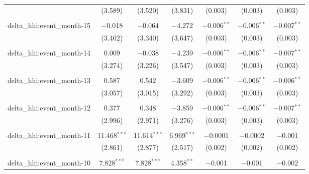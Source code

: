 \begin{table}[H]
{\begin{tabular}{@{\extracolsep{5pt}}lcccccc}
   & (3.589) & (3.520) & (3.831) & (0.003) & (0.003) & (0.003) \\  

   & & & & & & \\  

  delta\_hhi:event\_month-15 & $-$0.018 & $-$0.064 & $-$4.272 & $-$0.006$^{**}$ & $-$0.006$^{**}$ & $-$0.007$^{**}$ \\  

   & (3.402) & (3.340) & (3.647) & (0.003) & (0.003) & (0.003) \\  

   & & & & & & \\  

  delta\_hhi:event\_month-14 & 0.009 & $-$0.038 & $-$4.239 & $-$0.006$^{**}$ & $-$0.006$^{**}$ & $-$0.007$^{**}$ \\  

   & (3.274) & (3.226) & (3.547) & (0.003) & (0.003) & (0.003) \\  

   & & & & & & \\  

  delta\_hhi:event\_month-13 & 0.587 & 0.542 & $-$3.609 & $-$0.006$^{**}$ & $-$0.006$^{**}$ & $-$0.006$^{**}$ \\  

   & (3.057) & (3.015) & (3.292) & (0.003) & (0.003) & (0.003) \\  

   & & & & & & \\  

  delta\_hhi:event\_month-12 & 0.377 & 0.348 & $-$3.859 & $-$0.006$^{**}$ & $-$0.006$^{**}$ & $-$0.007$^{**}$ \\  

   & (2.996) & (2.971) & (3.276) & (0.003) & (0.003) & (0.003) \\  

   & & & & & & \\  

  delta\_hhi:event\_month-11 & 11.468$^{***}$ & 11.614$^{***}$ & 6.969$^{***}$ & $-$0.0001 & $-$0.0002 & $-$0.001 \\  

   & (2.861) & (2.877) & (2.517) & (0.002) & (0.002) & (0.002) \\  

   & & & & & & \\  

  delta\_hhi:event\_month-10 & 7.828$^{***}$ & 7.828$^{***}$ & 4.358$^{**}$ & $-$0.001 & $-$0.001 & $-$0.002 \\  


\end{tabular}}
\end{table}

